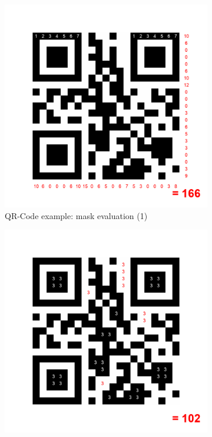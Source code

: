 \begin{figure}[H]
  \centering
  \begin{subfigure}{0.45\textwidth}
    \centering
    \includegraphics[width=\textwidth]{images/qr_mask_ex_eval_1}
    \caption{QR-Code example: mask evaluation (1)}
    \label{fig:qr_mask_ex_eval_1}
  \end{subfigure}
  \begin{subfigure}{0.45\textwidth}
    \centering
    \includegraphics[width=\textwidth]{images/qr_mask_ex_eval_2}

\end{subfigure}
\end{figure}
